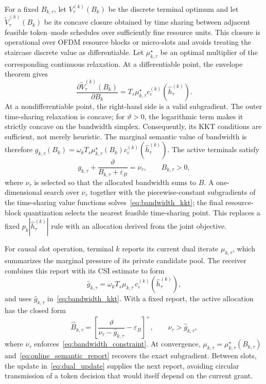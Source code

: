 \documentclass[journal]{IEEEtran}
\begin{document}
For a fixed $B_{k,\tau}$, let $V_{\tau}^{(k)}(B_k)$ be the discrete terminal optimum and let $\widetilde V_{\tau}^{(k)}(B_k)$ be its concave closure obtained by time sharing between adjacent feasible token--mode schedules over sufficiently fine resource units. This closure is operational over OFDM resource blocks or micro-slots and avoids treating the staircase discrete value as differentiable. Let $\mu_{k,\tau}^{\star}$ be an optimal multiplier of the corresponding continuous relaxation. At a differentiable point, the envelope theorem gives
\begin{equation}
\frac{\partial \widetilde V_{\tau}^{(k)}(B_k)}{\partial B_k}
=T_s\mu_{k,\tau}^{\star}
c_{\varepsilon}^{(k)}(\widehat h_{\tau}^{(k)}).
\label{eq:value_envelope}
\end{equation}
At a nondifferentiable point, the right-hand side is a valid subgradient. The outer time-sharing relaxation is concave; for $\vartheta>0$, the logarithmic term makes it strictly concave on the bandwidth simplex. Consequently, its KKT conditions are sufficient, not merely heuristic.
The marginal semantic value of bandwidth is therefore
$g_{k,\tau}(B_k)=\omega_kT_s\mu_{k,\tau}^{\star}(B_k)c_{\varepsilon}^{(k)}(\widehat h_{\tau}^{(k)})$. The active terminals satisfy
\begin{equation}
g_{k,\tau}+\frac{\vartheta}{B_{k,\tau}+\varepsilon_B}
=\nu_{\tau},
\qquad B_{k,\tau}>0,
\label{eq:bandwidth_kkt}
\end{equation}
where $\nu_{\tau}$ is selected so that the allocated bandwidth sums to $B$. A one-dimensional search over $\nu_{\tau}$ together with the piecewise-constant subgradients of the time-sharing value functions solves~\eqref{eq:bandwidth_kkt}; the final resource-block quantization selects the nearest feasible time-sharing point. This replaces a fixed $p_k|\widehat h_{\tau}^{(k)}|$ rule with an allocation derived from the joint objective.

For causal slot operation, terminal $k$ reports its current dual iterate $\mu_{k,\tau}$, which summarizes the marginal pressure of its private candidate pool. The receiver combines this report with its CSI estimate to form
\begin{equation}
\widehat g_{k,\tau}
=\omega_kT_s\mu_{k,\tau}
\,c_{\varepsilon}^{(k)}(\widehat h_{\tau}^{(k)}),
\label{eq:online_semantic_report}
\end{equation}
and uses $\widehat g_{k,\tau}$ in~\eqref{eq:bandwidth_kkt}. With a fixed report, the active allocation has the closed form
\begin{equation}
\widehat B_{k,\tau}
=\left[\frac{\vartheta}{\nu_{\tau}-\widehat g_{k,\tau}}
-\varepsilon_B\right]^+,
\qquad \nu_{\tau}>\widehat g_{k,\tau},
\label{eq:reported_bandwidth_solution}
\end{equation}
where $\nu_{\tau}$ enforces~\eqref{eq:bandwidth_constraint}. At convergence, $\mu_{k,\tau}=\mu_{k,\tau}^{\star}(B_{k,\tau})$ and~\eqref{eq:online_semantic_report} recovers the exact subgradient. Between slots, the update in~\eqref{eq:dual_update} supplies the next report, avoiding circular transmission of a token decision that would itself depend on the current grant.
\end{document}
